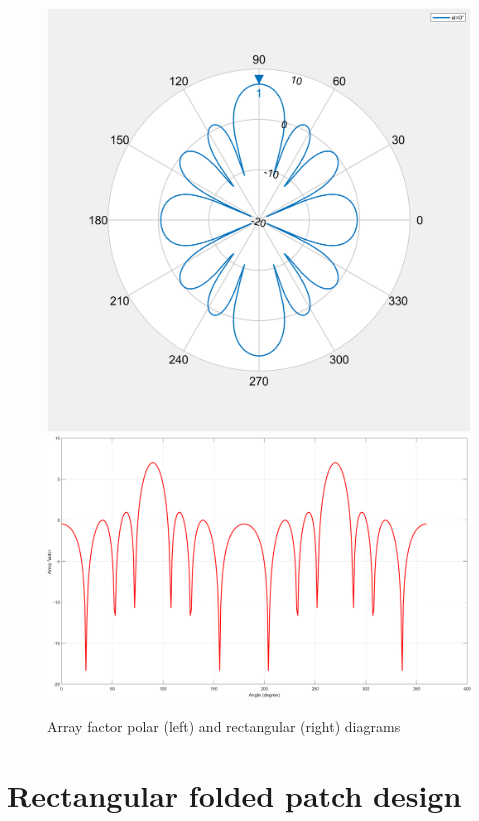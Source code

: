 \documentclass[12pt,a4paper]{article}
\begin{document}
{\begin{center}
\begin{figure}[h]
\includegraphics[scale=0.3]{array_factor_polar.png}
\includegraphics[scale=0.3]{array_factor_rectangular.png}
\caption{{Array factor polar (left) and rectangular (right) diagrams}}
\label{fig:array factor}
\end{figure}
\end{center}

\newpage
\section*{Rectangular folded patch design}

}
\end{document}
